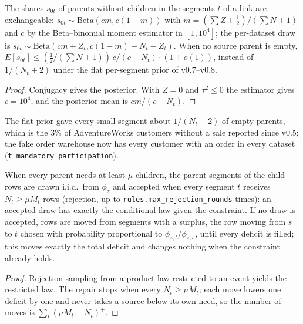 \begin{proposition}\label{prop:particippool}
The shares $s_{0t}$ of parents without children in the segments $t$ of a link are exchangeable: $s_{0t}\sim\mathrm{Beta}(cm,c(1-m))$ with $m=(\sum Z+\frac12)/(\sum N+1)$ and $c$ by the Beta--binomial moment estimator in $[1,10^4]$; the per-dataset draw is $s_{0t}\sim\mathrm{Beta}(cm+Z_t,c(1-m)+N_t-Z_t)$. When no source parent is empty, $E[s_{0t}]\le(\frac12/(\sum N+1))\,c/(c+N_t)\cdot(1+o(1))$, instead of $1/(N_t+2)$ under the flat per-segment prior of v0.7--v0.8.
\end{proposition}
\begin{proof}
Conjugacy gives the posterior. With $Z=0$ and $\tau^2\le0$ the estimator gives $c=10^4$, and the posterior mean is $cm/(c+N_t)$.
\end{proof}
\noindent The flat prior gave every small segment about $1/(N_t+2)$ of empty parents, which is the 3\% of AdventureWorks customers without a sale reported since v0.5; the fake order warehouse now has every customer with an order in every dataset (\texttt{t\_mandatory\_participation}).

\begin{proposition}\label{prop:cover}
When every parent needs at least $\mu$ children, the parent segments of the child rows are drawn i.i.d.\ from $\phi_{z}$ and accepted when every segment $t$ receives $N_t\ge\mu M_t$ rows (rejection, up to \texttt{rules.max\_rejection\_rounds} times): an accepted draw has exactly the conditional law given the constraint. If no draw is accepted, rows are moved from segments with a surplus, the row moving from $s$ to $t$ chosen with probability proportional to $\phi_{z,t}/\phi_{z,s}$, until every deficit is filled; this moves exactly the total deficit and changes nothing when the constraint already holds.
\end{proposition}
\begin{proof}
Rejection sampling from a product law restricted to an event yields the restricted law. The repair stops when every $N_t\ge\mu M_t$; each move lowers one deficit by one and never takes a source below its own need, so the number of moves is $\sum_t(\mu M_t-N_t)^+$.
\end{proof}

